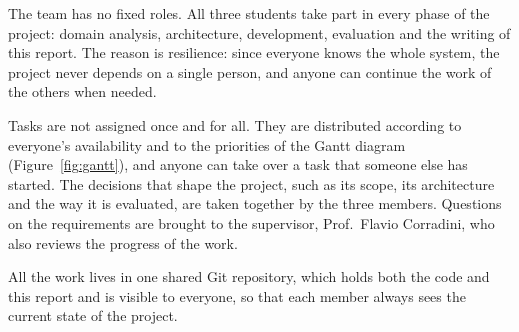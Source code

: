 The team has no fixed roles. All three students take part in every phase of the project:
domain analysis, architecture, development, evaluation and the writing of this report. The reason
is resilience: since everyone knows the whole system, the project never depends on a single
person, and anyone can continue the work of the others when needed.

Tasks are not assigned once and for all. They are distributed according to everyone's
availability and to the priorities of the Gantt diagram (Figure~\ref{fig:gantt}), and anyone can
take over a task that someone else has started. The decisions that shape the project, such as its
scope, its architecture and the way it is evaluated, are taken together by the three members.
Questions on the requirements are brought to the supervisor, Prof.\ Flavio Corradini, who also
reviews the progress of the work.

All the work lives in one shared Git repository, which holds both the code and this report and is
visible to everyone, so that each member always sees the current state of the project.
